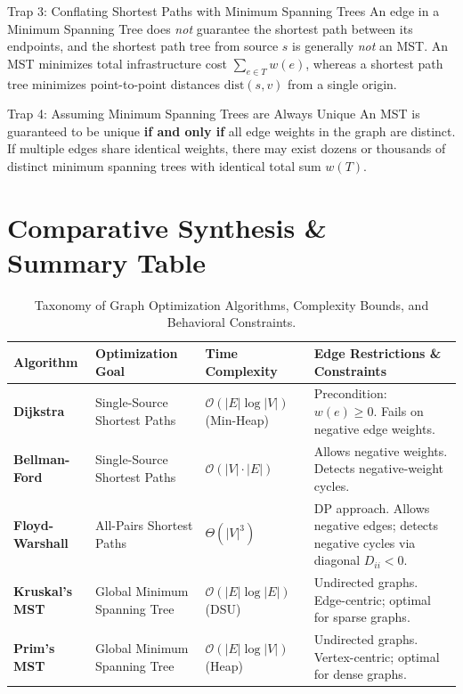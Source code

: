 \begin{trapbox}{Trap 3: Conflating Shortest Paths with Minimum Spanning Trees}
An edge in a Minimum Spanning Tree does \textit{not} guarantee the shortest path between its endpoints, and the shortest path tree from source $s$ is generally \textit{not} an MST. An MST minimizes total infrastructure cost $\sum_{e \in T} w(e)$, whereas a shortest path tree minimizes point-to-point distances $\text{dist}(s, v)$ from a single origin.
\end{trapbox}

\begin{trapbox}{Trap 4: Assuming Minimum Spanning Trees are Always Unique}
An MST is guaranteed to be unique \textbf{if and only if} all edge weights in the graph are distinct. If multiple edges share identical weights, there may exist dozens or thousands of distinct minimum spanning trees with identical total sum $w(T)$.
\end{trapbox}

\section{Comparative Synthesis \& Summary Table}

\begin{table}[htbp]
\centering
\small
\begin{tabular}{p{2.5cm} p{2.8cm} p{3.2cm} p{4.6cm}}
\toprule
\textbf{Algorithm} & \textbf{Optimization Goal} & \textbf{Time Complexity} & \textbf{Edge Restrictions \& Constraints} \\
\midrule
\textbf{Dijkstra} & Single-Source Shortest Paths & $\mathcal{O}(|E| \log |V|)$ (Min-Heap) & Precondition: $w(e) \ge 0$. Fails on negative edge weights. \\
\addlinespace
\textbf{Bellman-Ford} & Single-Source Shortest Paths & $\mathcal{O}(|V| \cdot |E|)$ & Allows negative weights. Detects negative-weight cycles. \\
\addlinespace
\textbf{Floyd-Warshall} & All-Pairs Shortest Paths & $\Theta(|V|^3)$ & DP approach. Allows negative edges; detects negative cycles via diagonal $D_{ii} < 0$. \\
\addlinespace
\textbf{Kruskal's MST} & Global Minimum Spanning Tree & $\mathcal{O}(|E| \log |E|)$ (DSU) & Undirected graphs. Edge-centric; optimal for sparse graphs. \\
\addlinespace
\textbf{Prim's MST} & Global Minimum Spanning Tree & $\mathcal{O}(|E| \log |V|)$ (Heap) & Undirected graphs. Vertex-centric; optimal for dense graphs. \\
\bottomrule
\end{tabular}
\caption{Taxonomy of Graph Optimization Algorithms, Complexity Bounds, and Behavioral Constraints.}
\end{table}

